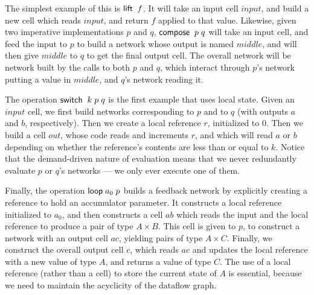 \documentclass[preprint,natbib]{sigplanconf}
\begin{document}
The simplest example of this is $\mbox{\textsf{{lift}}}\;\;f$. It will take an input
cell $input$, and build a new cell which reads $input$, and return $f$
applied to that value. Likewise, given two imperative implementations $p$
and $q$, $\mbox{\textsf{{compose}}}\;\;p\;q$ will take an input cell, and feed the
input to $p$ to build a network whose output is named $middle$, and
will then give $middle$ to $q$ to get the final output cell. The
overall network will be network built by the calls to both $p$ and
$q$, which interact through $p$'s network putting a value in $middle$,
and $q$'s network reading it.

The operation $\mbox{\textsf{{switch}}}\;\;k\;p\;q$ is the first example that uses 
local state. Given an $input$ cell, we first build networks corresponding
to $p$ and to $q$ (with outputs $a$ and $b$, respectively). Then we
create a local reference $r$, initialized to $0$. Then we build a cell $out$,
whose code reads and increments $r$, and which will read $a$ or $b$ depending
on whether the reference's contents are less than or equal to $k$. Notice
that the demand-driven nature of evaluation means that we never redundantly
evaluate $p$ or $q$'s networks --- we only ever execute one of them. 

Finally, the operation $\mbox{\textsf{{loop}}}\; a_0\;p$ builds a feedback network by
explicitly creating a reference to hold an accumulator parameter. It
constructs a local reference initialized to $a_0$, and then constructs
a cell $ab$ which reads the input and the local reference to produce a
pair of type $A \times B$. This cell is given to $p$, to construct a
network with an output cell $ac$, yielding pairs of type $A \times
C$. Finally, we construct the overall output cell $c$, which reads
$ac$ and updates the local reference with a new value of type $A$, and
returns a value of type $C$. The use of a local reference (rather than
a cell) to store the current state of $A$ is essential, because we need
to maintain the acyclicity of the dataflow graph. 
\end{document}
